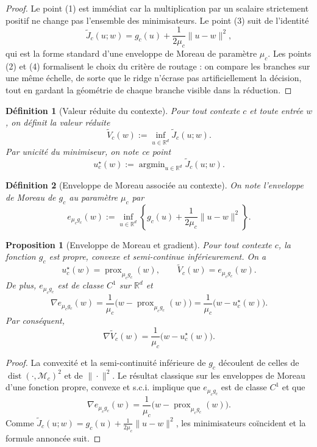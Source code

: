 \documentclass[11pt,a4paper]{article}
\newtheorem{definition}{Définition}[section]
\newtheorem{proposition}{Proposition}[section]
\DeclareMathOperator{\prox}{prox}
\DeclareMathOperator{\argmin}{argmin}
\DeclareMathOperator{\dist}{dist}
\newcommand{\R}{\mathbb R}
\newcommand{\Mcal}{\mathcal M}
\begin{document}
\begin{proof}
Le point (1) est immédiat car la multiplication par un scalaire strictement positif ne change pas l'ensemble des minimisateurs. Le point (3) suit de l'identité
\[
\widetilde J_c(u;w)=g_c(u)+\frac{1}{2\mu_c}\|u-w\|^2,
\]
qui est la forme standard d'une enveloppe de Moreau de paramètre \(\mu_c\). Les points (2) et (4) formalisent le choix du critère de routage : on compare les branches sur une même échelle, de sorte que le ridge n'écrase pas artificiellement la décision, tout en gardant la géométrie de chaque branche visible dans la réduction.
\end{proof}

\begin{definition}[Valeur réduite du contexte]
Pour tout contexte \(c\) et toute entrée \(w\), on définit la valeur réduite
\[
\widetilde V_c(w):=\inf_{u\in\R^d}\widetilde J_c(u;w).
\]
Par unicité du minimiseur, on note ce point
\[
u_c^\star(w):=\argmin_{u\in\R^d}\widetilde J_c(u;w).
\]
\end{definition}

\begin{definition}[Enveloppe de Moreau associée au contexte]
On note l'enveloppe de Moreau de \(g_c\) au paramètre \(\mu_c\) par
\[
e_{\mu_c g_c}(w):=\inf_{u\in\R^d}\left\{g_c(u)+\frac{1}{2\mu_c}\|u-w\|^2\right\}.
\]
\end{definition}

\begin{proposition}[Enveloppe de Moreau et gradient]
Pour tout contexte \(c\), la fonction \(g_c\) est propre, convexe et semi-continue inférieurement. On a
\[
u_c^\star(w)=\prox_{\mu_c g_c}(w),
\qquad
\widetilde V_c(w)=e_{\mu_c g_c}(w).
\]
De plus, \(e_{\mu_c g_c}\) est de classe \(C^1\) sur \(\R^d\) et
\[
\nabla e_{\mu_c g_c}(w)=\frac{1}{\mu_c}\bigl(w-\prox_{\mu_c g_c}(w)\bigr)
=\frac{1}{\mu_c}\bigl(w-u_c^\star(w)\bigr).
\]
Par conséquent,
\[
\nabla \widetilde V_c(w)=\frac{1}{\mu_c}\bigl(w-u_c^\star(w)\bigr).
\]
\end{proposition}

\begin{proof}
La convexité et la semi-continuité inférieure de \(g_c\) découlent de celles de \(\dist(\cdot,\Mcal_c)^2\) et de \(\|\cdot\|^2\). Le résultat classique sur les enveloppes de Moreau d'une fonction propre, convexe et s.c.i. implique que \(e_{\mu_c g_c}\) est de classe \(C^1\) et que
\[
\nabla e_{\mu_c g_c}(w)=\frac{1}{\mu_c}\bigl(w-\prox_{\mu_c g_c}(w)\bigr).
\]
Comme \(\widetilde J_c(u;w)=g_c(u)+\frac{1}{2\mu_c}\|u-w\|^2\), les minimisateurs coïncident et la formule annoncée suit.
\end{proof}
\end{document}
